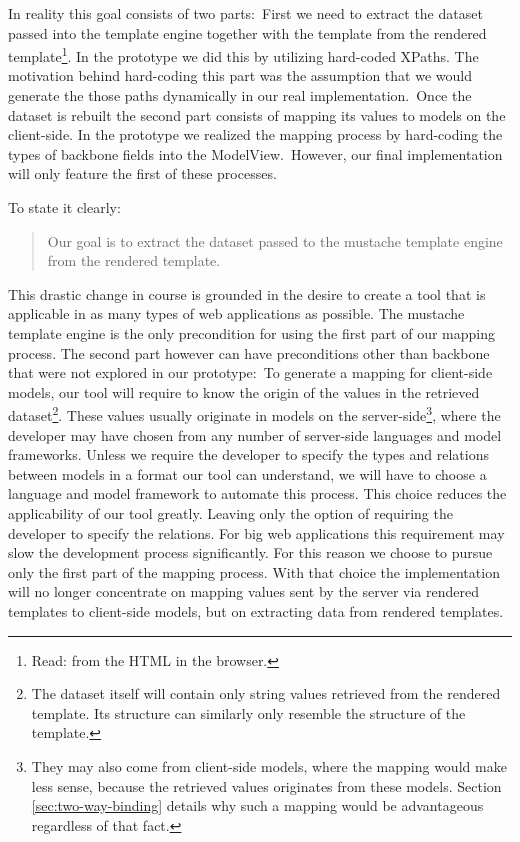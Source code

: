 \documentclass[thesis.tex]{subfiles}
\begin{document}
In reality this goal consists of two parts:\
First we need to extract the dataset passed into the template engine together
with the template from the rendered template\footnote{Read: from the HTML in the
browser.}.
In the prototype we did this by utilizing hard-coded XPaths. The motivation
behind hard-coding this part was the assumption that we would generate the those
paths dynamically in our real implementation.\
Once the dataset is rebuilt the second part consists of mapping its values
to models on the client-side. In the prototype we realized the mapping process
by hard-coding the types of backbone fields into the ModelView.\
However, our final implementation will only feature the first of these
processes.

To state it clearly:
\begin{quote}
Our goal is to extract the dataset passed to the mustache template engine from
the rendered template.
\end{quote}

This drastic change in course is grounded in the desire to create a tool that
is applicable in as many types of web applications as possible.
The mustache template engine is the only precondition for using the first part
of our mapping process. The second part however can have preconditions
other than backbone that were not explored in our prototype:\
To generate a mapping for client-side models, our tool will require to know the
origin of the values in the retrieved dataset\footnote{
	The dataset itself will contain only string values retrieved from the rendered
	template. Its structure can similarly only resemble the structure of the
	template.
}. These values usually originate in models on the server-side\footnote{
	They may also come from client-side models, where the mapping would make less
	sense, because the retrieved values originates from these models.
	Section \ref{sec:two-way-binding} details why such a mapping would be
	advantageous regardless of that fact.
}, where the developer may have chosen from any number of server-side languages
and model frameworks. Unless we require the developer to specify the types and
relations between models in a format our tool can understand, we will have to
choose a language and model framework to automate this process. This choice
reduces the applicability of our tool greatly. Leaving only the option of
requiring the developer to specify the relations. For big web applications this
requirement may slow the development process significantly.
For this reason we choose to pursue only the first part of the mapping process.
With that choice the implementation will no longer concentrate on mapping values
sent by the server via rendered templates to client-side models,
but on extracting data from rendered templates.
\end{document}
